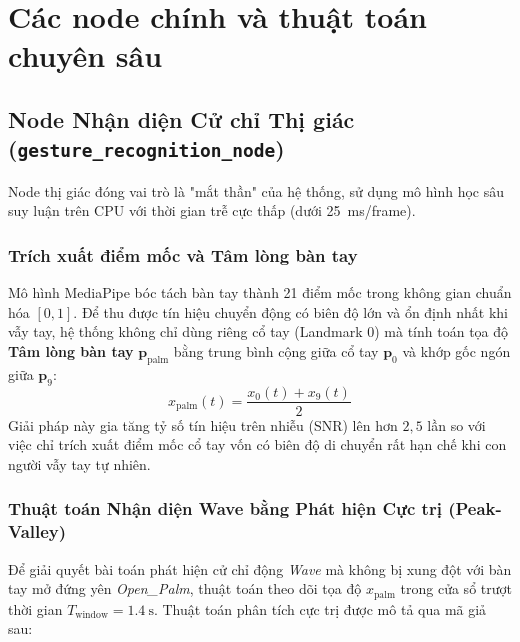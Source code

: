 \section{Các node chính và thuật toán chuyên sâu}

\subsection{Node Nhận diện Cử chỉ Thị giác (\texttt{gesture\_recognition\_node})}

Node thị giác đóng vai trò là "mắt thần" của hệ thống, sử dụng mô hình học sâu suy luận trên CPU với thời gian trễ cực thấp (dưới \SI{25}{\milli\second}/frame).

\subsubsection{Trích xuất điểm mốc và Tâm lòng bàn tay}
Mô hình MediaPipe bóc tách bàn tay thành 21 điểm mốc trong không gian chuẩn hóa $[0, 1]$. Để thu được tín hiệu chuyển động có biên độ lớn và ổn định nhất khi vẫy tay, hệ thống không chỉ dùng riêng cổ tay (Landmark 0) mà tính toán tọa độ \textbf{Tâm lòng bàn tay} $\mathbf{p}_{\text{palm}}$ bằng trung bình cộng giữa cổ tay $\mathbf{p}_0$ và khớp gốc ngón giữa $\mathbf{p}_9$:
\begin{equation}
    x_{\text{palm}}(t) = \frac{x_0(t) + x_9(t)}{2}
\end{equation}
Giải pháp này gia tăng tỷ số tín hiệu trên nhiễu (SNR) lên hơn $2{,}5$ lần so với việc chỉ trích xuất điểm mốc cổ tay vốn có biên độ di chuyển rất hạn chế khi con người vẫy tay tự nhiên.

\subsubsection{Thuật toán Nhận diện Wave bằng Phát hiện Cực trị (Peak-Valley)}
Để giải quyết bài toán phát hiện cử chỉ động \textit{Wave} mà không bị xung đột với bàn tay mở đứng yên \textit{Open\_Palm}, thuật toán theo dõi tọa độ $x_{\text{palm}}$ trong cửa sổ trượt thời gian $T_{\text{window}} = \SI{1.4}{\second}$. Thuật toán phân tích cực trị được mô tả qua mã giả sau:

